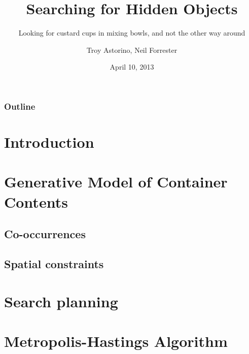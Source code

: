 \documentclass{beamer}
\title{Searching for Hidden Objects}
\subtitle{Looking for custard cups in mixing bowls, and not the other way around}
\author{Troy Astorino, Neil Forrester}
\date{April 10, 2013}
\institute[6.834 -- MIT]{Cognitive Robotics \\ Massachusetts Institute of Technology}
\begin{document}
\begin{frame}
  \maketitle
\end{frame}

\begin{frame}
  \frametitle{Outline}
  \tableofcontents
\end{frame}

\section{Introduction}


\section{Generative Model of Container Contents}
\subsection{Co-occurrences}






\subsection{Spatial constraints}


\section{Search planning}


\section{Metropolis-Hastings Algorithm}

\end{document}
